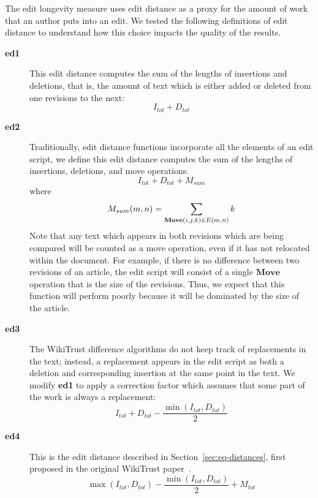 The edit longevity measure uses edit distance as a proxy for the
amount of work that an author puts into an edit.
We tested the following definitions of edit distance to understand
how this choice impacts the quality of the results.
%
\begin{description}

\item[\textbf{ed1}] This edit distance computes the sum of the lengths
    of insertions and deletions, that is, the amount of text which
    is either added or deleted from one revisions to the next:
    \begin{equation*}
    I_{tot} + D_{tot}
    \end{equation*}

\item[\textbf{ed2}] Traditionally, edit distance functions incorporate
    all the elements of an edit script, we define
    this edit distance computes the sum of the lengths
    of insertions, deletions, and move operations.
    \begin{equation*}
    I_{tot} + D_{tot} + M_{sum}
    \end{equation*}
    where
    \begin{equation*}
    M_{sum}(m,n) = \sum_{\mathbf{Move}(i, j, k) \in E(m,n)} k \\
    \end{equation*}
    Note that any text which appears in both revisions which are being
    compared will be counted as a move operation, even if it has not
    relocated within the document.
    For example, if there is no difference between two revisions of
    an article, the edit script will consist of a single $\mathbf{Move}$
    operation that is the size of the revisions.
    Thus, we expect that this function will perform poorly because
    it will be dominated by the size of the article.

\item[\textbf{ed3}]
    The WikiTrust difference algorithms do not keep track of replacements
    in the text; instead, a replacement appears in the edit script as
    both a deletion and corresponding insertion at the same point in the text.
    We modify \textbf{ed1} to apply a correction factor which
    assumes that some part of the work is always a replacement:
    \begin{equation*}
    I_{tot} + D_{tot} - \frac{\min(I_{tot}, D_{tot})}{2}
    \end{equation*}

\item[\textbf{ed4}] This is the edit distance described in
    Section~\ref{sec:eq-distances}, first proposed in
    the original WikiTrust paper~\cite{Adler2007}.
    \begin{equation*}
    \max(I_{tot}, D_{tot}) - \frac{\min(I_{tot}, D_{tot})}{2}
		+ M_{tot}
    \end{equation*}


\end{description}
